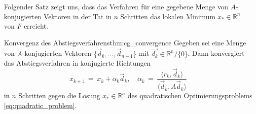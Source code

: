 Folgender Satz zeigt uns, dass das Verfahren für eine gegebene Menge von $A$-konjugierten Vektoren in der Tat in $n$ Schritten das lokalen Minimum $x_* \in \mathbb{R}^n$ von $F$ erreicht.
\begin{theorem}{Konvergenz des Abstiegsverfahrens}{thm:cg_convergence}
Gegeben sei eine Menge von $A$-konjugierten Vektoren $\lbrace \vec{d}_0, \ldots, \vec{d}_{n-1} \rbrace$ mit $\vec{d_k} \in \mathbb{R}^n / \lbrace 0 \rbrace$. Dann konvergiert das Abstiegsverfahren in konjugierte Richtungen
\begin{equation}
\label{eq:conjugate_descent_optimal}
x_{k+1} \ = \ x_k + \alpha_k \vec{d}_k, \quad \alpha_k \ = \ \frac{\langle r_k, \vec{d}_k \rangle}{\langle \vec{d}_k, A\vec{d}_k\rangle}
\end{equation}
in $n$ Schritten gegen die Lösung $x_* \in \mathbb{R}^n$ des quadratischen Optimierungsproblems \eqref{eq:quadratic_problem}.
\end{theorem}
